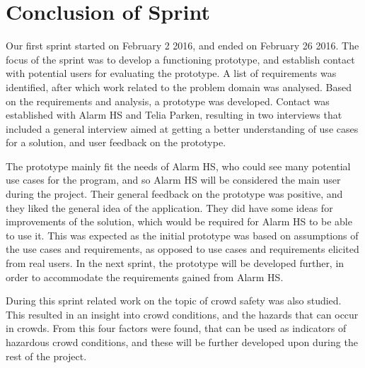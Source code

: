 \section{Conclusion of Sprint}
Our first sprint started on February 2 2016, and ended on February 26 2016. The focus of the sprint was to develop a functioning prototype, and establish contact with potential users for evaluating the prototype. A list of requirements was identified, after which work related to the problem domain was analysed. Based on the requirements and analysis, a prototype was developed. Contact was established with Alarm HS and Telia Parken, resulting in two interviews that included a general interview aimed at getting a better understanding of use cases for a solution, and user feedback on the prototype.

The prototype mainly fit the needs of Alarm HS, who could see many potential use cases for the program, and so Alarm HS will be considered the main user during the project. Their general feedback on the prototype was positive, and they liked the general idea of the application. They did have some ideas for improvements of the solution, which would be required for Alarm HS to be able to use it. This was expected as the initial prototype was based on assumptions of the use cases and requirements, as opposed to use cases and requirements elicited from real users. In the next sprint, the prototype will be developed further, in order to accommodate the requirements gained from Alarm HS.

During this sprint related work on the topic of crowd safety was also studied. This resulted in an insight into crowd conditions, and the hazards that can occur in crowds. From this four factors were found, that can be used as indicators of hazardous crowd conditions, and these will be further developed upon during the rest of the project.




